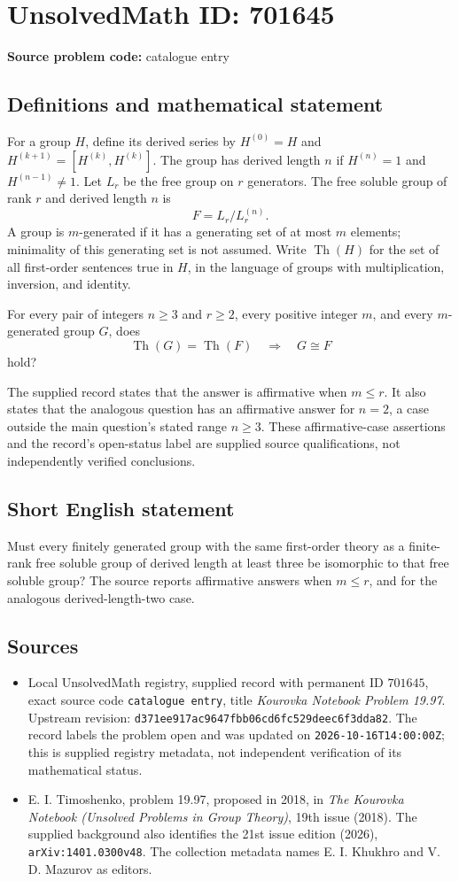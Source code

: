 \documentclass[11pt]{article}
\begin{document}
\section*{UnsolvedMath ID: 701645}
\textbf{Source problem code:} catalogue entry
\subsection{Definitions and mathematical statement}
For a group \(H\), define its derived series by \(H^{(0)}=H\) and \(H^{(k+1)}=[H^{(k)},H^{(k)}]\). The group has derived length \(n\) if \(H^{(n)}=1\) and \(H^{(n-1)}\neq 1\). Let \(L_r\) be the free group on \(r\) generators. The free soluble group of rank \(r\) and derived length \(n\) is
\[
F=L_r/L_r^{(n)}.
\]
A group is \(m\)-generated if it has a generating set of at most \(m\) elements; minimality of this generating set is not assumed. Write \(\operatorname{Th}(H)\) for the set of all first-order sentences true in \(H\), in the language of groups with multiplication, inversion, and identity.

For every pair of integers \(n\geq 3\) and \(r\geq 2\), every positive integer \(m\), and every \(m\)-generated group \(G\), does
\[
\operatorname{Th}(G)=\operatorname{Th}(F)
\quad\Longrightarrow\quad
G\cong F
\]
hold?

The supplied record states that the answer is affirmative when \(m\leq r\). It also states that the analogous question has an affirmative answer for \(n=2\), a case outside the main question's stated range \(n\geq 3\). These affirmative-case assertions and the record's open-status label are supplied source qualifications, not independently verified conclusions.
\subsection{Short English statement}
Must every finitely generated group with the same first-order theory as a finite-rank free soluble group of derived length at least three be isomorphic to that free soluble group? The source reports affirmative answers when \(m\leq r\), and for the analogous derived-length-two case.
\subsection{Sources}
\begin{itemize}
\item Local UnsolvedMath registry, supplied record with permanent ID \(701645\), exact source code \texttt{catalogue entry}, title \emph{Kourovka Notebook Problem 19.97}. Upstream revision: \texttt{d371ee917ac9647fbb06cd6fc529deec6f3dda82}. The record labels the problem open and was updated on \texttt{2026-10-16T14:00:00Z}; this is supplied registry metadata, not independent verification of its mathematical status.
\item E. I. Timoshenko, problem 19.97, proposed in 2018, in \emph{The Kourovka Notebook (Unsolved Problems in Group Theory)}, 19th issue (2018). The supplied background also identifies the 21st issue edition (2026), \texttt{arXiv:1401.0300v48}. The collection metadata names E. I. Khukhro and V. D. Mazurov as editors.
\end{itemize}
\end{document}
